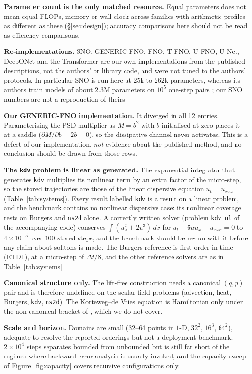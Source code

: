 \documentclass[11pt]{article}
\theoremstyle{definition}
\theoremstyle{remark}
\begin{document}
\textbf{Parameter count is the only matched resource.} Equal parameters does not
mean equal FLOPs, memory or wall-clock across families with arithmetic profiles
as different as these (\S\ref{sec:design}); accuracy comparisons here should not
be read as efficiency comparisons.

\textbf{Re-implementations.} SNO, GENERIC-FNO, FNO, T-FNO, U-FNO, U-Net, DeepONet
and the Transformer are our own implementations from the published descriptions,
not the authors' or library code, and were not tuned to the authors' protocols.
In particular SNO is run here at $25$k to $262$k parameters, whereas its authors
train models of about $2.3$M parameters on $10^{5}$ one-step pairs
\citep{makara2026sno}; our SNO numbers are not a reproduction of theirs.

\textbf{Our GENERIC-FNO implementation.} It diverged in all 12 entries. Parameterising the
PSD multiplier as $M=b^2$ with $b$ initialised at zero places it at a saddle
($\partial M/\partial b=2b=0$), so the dissipative channel never activates. This
is a defect of our implementation, \emph{not} evidence about the published
method, and no conclusion should be drawn from those rows.

\textbf{The \texttt{kdv} problem is linear as generated.} The exponential
integrator that generates \texttt{kdv} multiplies its nonlinear term by an extra
factor of the micro-step, so the stored trajectories are those of the linear
dispersive equation $u_t=u_{xxx}$ (Table~\ref{tab:systems}). Every result labelled
\texttt{kdv} is a result on a linear problem, and the benchmark contains no
nonlinear dispersive case: its nonlinear coverage rests on Burgers and
\texttt{ns2d} alone. A correctly written solver (problem \texttt{kdv\_nl} of the accompanying code)
conserves $\int(u_x^2+2u^3)\,dx$ for $u_t+6uu_x-u_{xxx}=0$ to $4\times10^{-5}$ over
$100$ stored steps, and the benchmark should be re-run with it before any claim
about solitons is made. The Burgers reference is first-order in time (ETD1), at a
micro-step of $\Delta t/8$, and the other reference solvers are as in
Table~\ref{tab:systems}.

\textbf{Canonical structure only.} The lift-free construction needs a canonical
$(q,p)$ pair and is therefore undefined on the scalar-field problems (advection,
heat, Burgers, \texttt{kdv}, \texttt{ns2d}). The Korteweg--de Vries equation is
Hamiltonian only under the non-canonical bracket of \citet{gardner1971kdv}, which
we do not cover.

\textbf{Scale and horizon.} Domains are small ($32$--$64$ points in $1$-D, $32^2$,
$16^3$, $64^2$), adequate to resolve the reported orderings but not a deployment
benchmark. $2\times10^{4}$ steps separates bounded from unbounded but is still far
short of the regimes where backward-error analysis is usually invoked, and the
capacity sweep of Figure~\ref{fig:capacity} covers recursive configurations
only.
\end{document}
